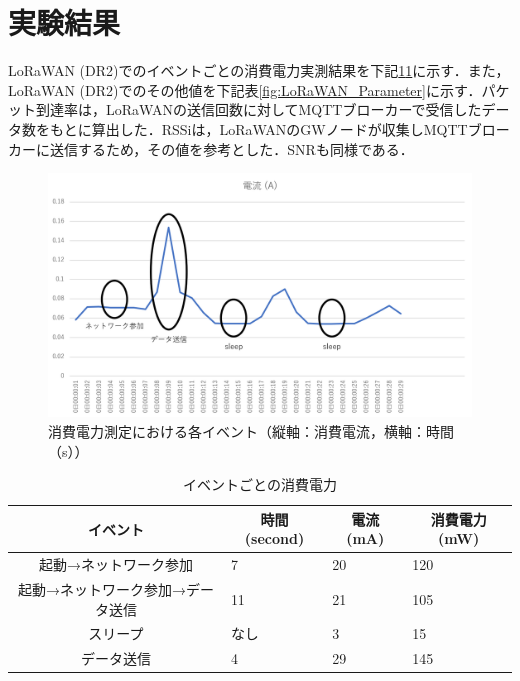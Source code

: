 \section{実験結果}
LoRaWAN (DR2)でのイベントごとの消費電力実測結果を下記\ref{fig:result_power_consumtion}\ref{fig:LoRaWAN_PowerConsumption}に示す．また，LoRaWAN (DR2)でのその他値を下記表\ref{fig:LoRaWAN_Parameter}に示す．パケット到達率は，LoRaWANの送信回数に対してMQTTブローカーで受信したデータ数をもとに算出した．RSSiは，LoRaWANのGWノードが収集しMQTTブローカーに送信するため，その値を参考とした．SNRも同様である．

\begin{figure}[]
    \begin{center}
    \includegraphics[width=15cm]{figures/LoRaWAN_消費電力実験.png}
    \caption{消費電力測定における各イベント（縦軸：消費電流，横軸：時間（s））}
    \label{fig:result_power_consumtion}
    \end{center}
\end{figure}

\begin{table}[]
    \caption{イベントごとの消費電力}\label{fig:LoRaWAN_PowerConsumption}
    \centering
    \begin{tabular}{|c|l|l|l|}
    \hline
    \textbf{イベント}     & \multicolumn{1}{c|}{\textbf{時間 (second)}} & \multicolumn{1}{c|}{\textbf{電流 (mA)}} & \multicolumn{1}{c|}{\textbf{消費電力 (mW)}} \\ \hline
    起動→ネットワーク参加       & 7                                         & 20                                    & 120                                     \\ \hline
    起動→ネットワーク参加→データ送信 & 11                                        & 21                                    & 105                                     \\ \hline
    スリープ              & なし                                        & 3                                     & 15                                      \\ \hline
    データ送信             & 4                                         & 29                                    & 145                                     \\ \hline
    \end{tabular}
\end{table}

